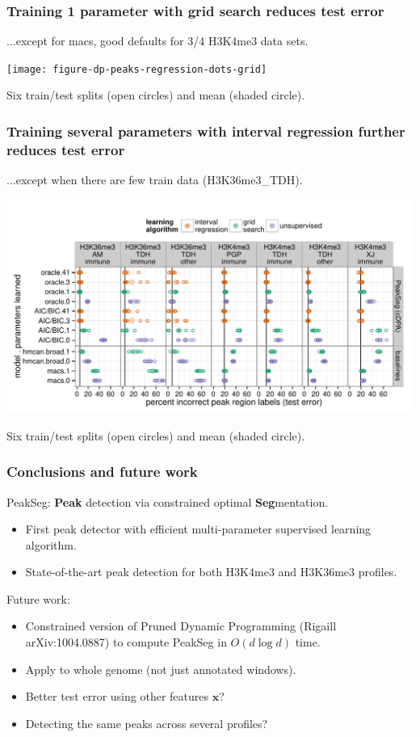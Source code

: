\documentclass{beamer}
\begin{document}
\begin{frame}
  \frametitle{Training 1 parameter with grid search reduces test error}

  ...except for macs, good defaults for 3/4 H3K4me3 data sets.

  \texttt{[image: figure-dp-peaks-regression-dots-grid]}

  Six train/test splits (open circles) and mean (shaded circle).
\end{frame}

\begin{frame}
  \frametitle{Training several parameters with interval regression 
    further reduces test error}

  ...except when there are few train data (H3K36me3\_TDH).

  \includegraphics[width=\textwidth]{figure-dp-peaks-regression-dots}

  Six train/test splits (open circles) and mean (shaded circle).
\end{frame}

\begin{frame}
  \frametitle{Conclusions and future work}
  PeakSeg: \textbf{Peak} detection via constrained optimal
  \textbf{Seg}mentation.
  \begin{itemize}
  \item First peak detector with efficient multi-parameter supervised
    learning algorithm.
  \item State-of-the-art peak detection for both H3K4me3 and H3K36me3
    profiles.
  \end{itemize}
  Future work:
  \begin{itemize}
  \item Constrained version of Pruned Dynamic Programming (Rigaill
    arXiv:1004.0887) to compute PeakSeg in $O(d\log d)$ time.
  \item Apply to whole genome (not just annotated windows).
  \item Better test error using other features $\mathbf x$?
  \item Detecting the same peaks across several profiles?
  \end{itemize}
\end{frame}
\end{document}
